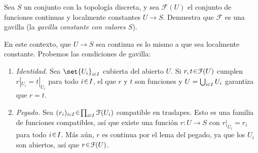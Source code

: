 \begin{ejer}
Sea $S$ un conjunto con la topología discreta, y sea $\mathcal{F}(U)$ el conjunto de funciones continuas y localmente constantes $U\to S$. Demuestra que $\mathcal{F}$ es una gavilla (la \emph{gavilla constante con valores $S$}). 
\end{ejer}
\begin{sol}
En este contexto, que $U\to S$ sea continua es lo mismo a que sea localmente constante. Probemos las condiciones de gavilla:
\begin{enumerate}
    \item \emph{Identidad.} Sea $\set{U_i}_{i\en I}$ cubierta del abierto $U$. Si $r,t\en\mathcal{F}(U)$ cumplen $r|_{U_i}=t|_{U_i}$ para todo $i\en I$, el que $r$ y $t$ son funciones y $U=\bigcup_{i\en I}U_i$ garantiza que $r=t$.

    \item \emph{Pegado.} Sea $(r_i)_{i\en I}\en\prod_{i\en I}\mathcal{F}(U_i)$ compatible en traslapes. Esto es una familia de funciones compatibles, así que existe una función $r\colon U\to S$ con $r|_{U_i}=r_i$ para todo $i\en I$. Más aún, $r$ es continua por el lema del pegado, ya que los $U_i$ son abiertos, así que $r\en\mathcal{F}(U)$.
\end{enumerate}
\end{sol}